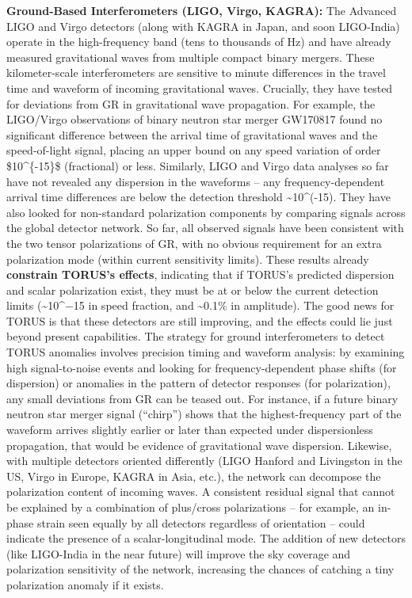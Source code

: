 \textbf{Ground-Based Interferometers (LIGO, Virgo, KAGRA):} The Advanced
LIGO and Virgo detectors (along with KAGRA in Japan, and soon
LIGO-India) operate in the high-frequency band (tens to thousands of Hz)
and have already measured gravitational waves from multiple compact
binary mergers. These kilometer-scale interferometers are sensitive to
minute differences in the travel time and waveform of incoming
gravitational waves. Crucially, they have tested for deviations from GR
in gravitational wave propagation. For example, the LIGO/Virgo
observations of binary neutron star merger GW170817 found no significant
difference between the arrival time of gravitational waves and the
speed-of-light signal, placing an upper bound on any speed variation of
order \$10\^{}\{-15\}\$ (fractional) or less​. Similarly, LIGO and Virgo
data analyses so far have not revealed any dispersion in the waveforms
-- any frequency-dependent arrival time differences are below the
detection threshold \textasciitilde{}10\^{}(-15)​. They have also looked
for non-standard polarization components by comparing signals across the
global detector network. So far, all observed signals have been
consistent with the two tensor polarizations of GR, with no obvious
requirement for an extra polarization mode (within current sensitivity
limits). These results already \textbf{constrain TORUS's effects},
indicating that if TORUS's predicted dispersion and scalar polarization
exist, they must be at or below the current detection limits
(\textasciitilde{}10\^{}−15 in speed fraction, and
\textasciitilde{}0.1\% in amplitude). The good news for TORUS is that
these detectors are still improving, and the effects could lie just
beyond present capabilities​. The strategy for ground interferometers to
detect TORUS anomalies involves precision timing and waveform analysis:
by examining high signal-to-noise events and looking for
frequency-dependent phase shifts (for dispersion) or anomalies in the
pattern of detector responses (for polarization), any small deviations
from GR can be teased out. For instance, if a future binary neutron star
merger signal (``chirp'') shows that the highest-frequency part of the
waveform arrives slightly earlier or later than expected under
dispersionless propagation, that would be evidence of gravitational wave
dispersion. Likewise, with multiple detectors oriented differently (LIGO
Hanford and Livingston in the US, Virgo in Europe, KAGRA in Asia, etc.),
the network can decompose the polarization content of incoming waves. A
consistent residual signal that cannot be explained by a combination of
plus/cross polarizations -- for example, an in-phase strain seen equally
by all detectors regardless of orientation -- could indicate the
presence of a scalar-longitudinal mode. The addition of new detectors
(like LIGO-India in the near future) will improve the sky coverage and
polarization sensitivity of the network, increasing the chances of
catching a tiny polarization anomaly if it exists​.

